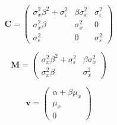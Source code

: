 \documentclass[
]{book}
\newenvironment{Shaded}{\begin{snugshade}}{\end{snugshade}}
\newcommand{\FunctionTok}[1]{\textcolor[rgb]{0.00,0.00,0.00}{#1}}
\newcommand{\NormalTok}[1]{#1}
\newcommand{\SpecialCharTok}[1]{\textcolor[rgb]{0.00,0.00,0.00}{#1}}
\theoremstyle{definition}
\theoremstyle{definition}
\theoremstyle{definition}
\theoremstyle{remark}
\begin{document}
\begin{Shaded}
\end{Shaded}

\begin{equation*}\mathbf{C} =\left( \begin{array}{ccc} \sigma  _{x} ^{2} \beta  ^{2} + \sigma  _{\varepsilon } ^{2} & \beta  \sigma  _{x} ^{2} & \sigma  _{\varepsilon } ^{2} \\ \sigma  _{x} ^{2} \beta  & \sigma  _{x} ^{2} & 0 \\ \sigma  _{\varepsilon } ^{2} & 0 & \sigma  _{\varepsilon } ^{2} \end{array} \right)\end{equation*}

\begin{Shaded}
\end{Shaded}

\begin{equation*}\mathbf{M} =\left( \begin{array}{cc} \sigma  _{x} ^{2} \beta  ^{2} + \sigma  _{\varepsilon } ^{2} & \beta  \sigma  _{x} ^{2} \\ \sigma  _{x} ^{2} \beta  & \sigma  _{x} ^{2} \end{array} \right)\end{equation*}

\begin{Shaded}
\end{Shaded}

\begin{equation*}\mathbf{v} =\left( \begin{array}{c} \alpha  + \beta  \mu  _{x} \\ \mu  _{x} \\ 0 \end{array} \right)\end{equation*}
\end{document}
